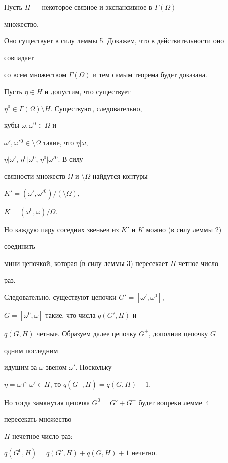  


\begin{pf} 


Пусть $H$ --- некоторое связное и экспансивное в $\Gamma(\Omega)$ 


множество. 


Оно существует в силу леммы 5. Докажем, что в действительности оно 


совпадает 


со всем множеством $\Gamma(\Omega)$ и тем самым теорема будет доказана. 


Пусть $\eta\in H$ и допустим, что существует 


$\eta^0\in\Gamma(\Omega)\setminus H$. Существуют, следовательно, 


кубы $\omega,\omega^0\in\Omega$ и 


$\omega',\omega'{}^0\in\setminus\Omega$ такие, что $\eta|\omega$, 


$\eta|\omega'$, $\eta^0|\omega^0$, $\eta^0|\omega'{}^0$. В силу 


связности множеств $\Omega$ и $\setminus\Omega$ найдутся контуры 


$K'=(\omega',\omega'{}^0)/(\setminus\Omega)$, 


$K=(\omega^0,\omega)/\Omega$. 


 


Но каждую пару соседних звеньев из $K'$ и $K$ можно (в силу леммы 2) 


соединить 


мини-цепочкой, которая (в силу леммы 3) пересекает $H$ четное число 


раз. 


Следовательно, существуют цепочки $G'=[\omega',\omega^0]$, 


$G=[\omega^0,\omega]$ такие, что числа $q(G',H)$ и 


$q(G,H)$ четные. Образуем далее цепочку $G^+$, дополнив цепочку $G$ 


одним последним 


идущим за $\omega$ звеном $\omega'$. Поскольку 


$\eta=\omega\cap\omega'\in H$, то $q(G^+,H)=q(G,H)+1$. 


Но тогда замкнутая цепочка $G^0=G'+G^+$ будет вопреки лемме~4 


пересекать множество 


$H$ нечетное число раз: 


$q(G^0,H)=q(G',H)+q(G,H)+1$ нечетно. 


\end{pf} 


